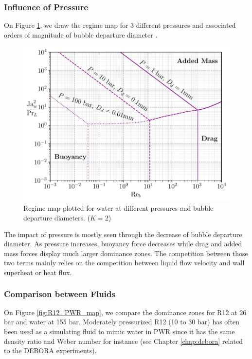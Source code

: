 \subsubsection{Influence of Pressure}

On Figure \ref{fig:press_map}, we draw the regime map for 3 different pressures and associated orders of magnitude of bubble departure diameter \cite{kocamustafaogullari_pressure_1983}.


\begin{figure}[h!]
\centering
\includegraphics[width=0.6\linewidth]{img/bub_dyn/dep_maps/press_map.pdf}
\caption{Regime map plotted for water at different pressures and bubble departure diameters. ($K=2$)}
\label{fig:press_map}
\end{figure}


The impact of pressure is mostly seen through the decrease of bubble departure diameter. As pressure increases, buoyancy force decreases while drag and added mass forces display much larger dominance zones. The competition between those two terms mainly relies on the competition between liquid flow velocity and wall superheat or heat flux.

 
\subsubsection{Comparison between Fluids}

 
On Figure \ref{fig:R12_PWR_map}, we compare the dominance zones for R12 at 26 bar and water at 155 bar. Moderately pressurized R12 (10 to 30 bar) has often been used as a simulating fluid to mimic water in PWR since it has the same density ratio and Weber number for instance (see Chapter \ref{chap:debora} related to the DEBORA experiments).

